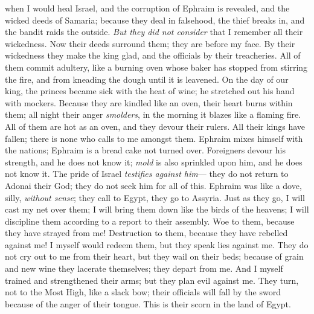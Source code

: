 \begin{biblechapter} %
\verse when I would heal Israel, 
and the corruption of Ephraim is revealed, 
and the wicked deeds of Samaria; 
because they deal in falsehood, 
the thief breaks in, 
and the bandit raids the outside.
\verse \textit{But they did not consider} 
that I remember all their wickedness. 
Now their deeds surround them; 
they are before my face.
\verse By their wickedness they make the king glad, 
and the officials by their treacheries.
\verse All of them commit adultery, 
like a burning oven 
whose baker has stopped from stirring the fire, 
and from kneading the dough until it is leavened.
\verse On the day of our king, the princes 
became sick with the heat of wine; 
he stretched out his hand with mockers.
\verse Because they are kindled like an oven, 
their heart burns within them; 
all night their anger \textit{smolders}, 
in the morning it blazes like a flaming fire.
\verse All of them are hot as an oven, 
and they devour their rulers. 
All their kings have fallen; 
there is none who calls to me amongst them.
\verse Ephraim mixes himself 
with the nations; 
Ephraim is a bread cake 
not turned over.
\verse Foreigners devour his strength, 
and he does not know it; 
\textit{mold} is also sprinkled upon him, 
and he does not know it.
\verse The pride of Israel \textit{testifies against him}— 
they do not return to Adonai their God; 
they do not seek him for all of this.
\verse Ephraim was like a dove, 
silly, \textit{without sense}; 
they call to Egypt, 
they go to Assyria.
\verse Just as they go, I will cast my net 
over them; 
I will bring them down 
like the birds of the heavens; 
I will discipline them 
according to a report to their assembly.
\verse Woe to them, because they have strayed from me! 
Destruction to them, because they have rebelled against me! 
I myself would redeem them, 
but they speak lies against me.
\verse They do not cry out to me from their heart, 
but they wail on their beds; 
because of grain and new wine they lacerate themselves; 
they depart from me.
\verse And I myself trained 
and strengthened their arms; 
but they plan evil against me.
\verse They turn, not to the Most High, 
like a slack bow; 
their officials will fall by the sword 
because of the anger of their tongue. 
This is their scorn 
in the land of Egypt.
\end{biblechapter}

